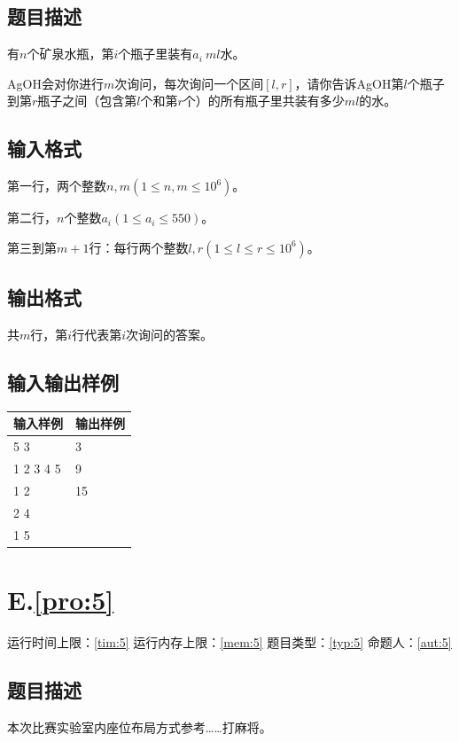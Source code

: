 \documentclass[
	lang=cn,
	color=green
]{elegantbook}
\begin{document}
\section*{题目描述}
有$n$个矿泉水瓶，第$i$个瓶子里装有$a_i\ ml$水。

AgOH会对你进行$m$次询问，每次询问一个区间$[l,r]$，请你告诉AgOH第$l$个瓶子到第$r$瓶子之间（包含第$l$个和第$r$个）的所有瓶子里共装有多少$ml$的水。

\section*{输入格式}
第一行，两个整数$n,m(1 \leq n,m \leq 10^6)$。

第二行，$n$个整数$a_i(1 \leq a_i \leq 550)$。

第三到第$m+1$行：每行两个整数$l,r(1 \leq l \leq r \leq 10^6)$。

\section*{输出格式}
共$m$行，第$i$行代表第$i$次询问的答案。

\section*{输入输出样例}
\begin{tabularx}{450pt}{X|X}
	\toprule
	输入样例  & 输出样例 \\
	\midrule
	5 3       & 3        \\
	1 2 3 4 5 & 9        \\
	1 2       & 15       \\
	2 4       &          \\
	1 5       &          \\
	\bottomrule
\end{tabularx}

\newpage
\chapter*{E.\quad \ref*{pro:5}}
\begin{center}
	运行时间上限：\ref*{tim:5} \quad 运行内存上限：\ref*{mem:5} \quad 题目类型：\ref*{typ:5} \quad 命题人：\ref*{aut:5}
\end{center}

\section*{题目描述}
本次比赛实验室内座位布局方式参考……打麻将。
\end{document}
